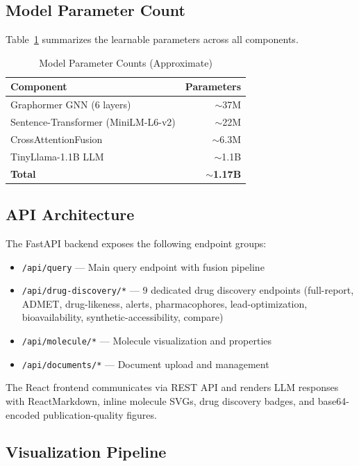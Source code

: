 \documentclass[conference]{IEEEtran}
\begin{document}
\subsection{Model Parameter Count}

Table~\ref{tab:params} summarizes the learnable parameters across all components.

\begin{table}[h]
\centering
\caption{Model Parameter Counts (Approximate)}
\label{tab:params}
\begin{tabular}{@{}lr@{}}
\toprule
\textbf{Component} & \textbf{Parameters} \\
\midrule
Graphormer GNN (6 layers) & $\sim$37M \\
Sentence-Transformer (MiniLM-L6-v2) & $\sim$22M \\
CrossAttentionFusion & $\sim$6.3M \\
TinyLlama-1.1B LLM & $\sim$1.1B \\
\midrule
\textbf{Total} & $\sim$\textbf{1.17B} \\
\bottomrule
\end{tabular}
\end{table}

\subsection{API Architecture}

The FastAPI backend exposes the following endpoint groups:

\begin{itemize}
    \item \texttt{/api/query} --- Main query endpoint with fusion pipeline
    \item \texttt{/api/drug-discovery/*} --- 9 dedicated drug discovery endpoints (full-report, ADMET, drug-likeness, alerts, pharmacophores, lead-optimization, bioavailability, synthetic-accessibility, compare)
    \item \texttt{/api/molecule/*} --- Molecule visualization and properties
    \item \texttt{/api/documents/*} --- Document upload and management
\end{itemize}

The React frontend communicates via REST API and renders LLM responses with ReactMarkdown, inline molecule SVGs, drug discovery badges, and base64-encoded publication-quality figures.

\subsection{Visualization Pipeline}
\end{document}
